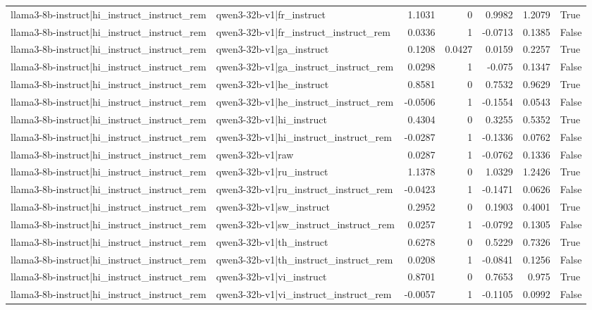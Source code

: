 \begin{table}
\begin{tabular}{l l r r r r l}
llama3-8b-instruct|hi_instruct_instruct_rem & qwen3-32b-v1|fr_instruct & 1.1031 & 0 & 0.9982 & 1.2079 & True \\
llama3-8b-instruct|hi_instruct_instruct_rem & qwen3-32b-v1|fr_instruct_instruct_rem & 0.0336 & 1 & -0.0713 & 0.1385 & False \\
llama3-8b-instruct|hi_instruct_instruct_rem & qwen3-32b-v1|ga_instruct & 0.1208 & 0.0427 & 0.0159 & 0.2257 & True \\
llama3-8b-instruct|hi_instruct_instruct_rem & qwen3-32b-v1|ga_instruct_instruct_rem & 0.0298 & 1 & -0.075 & 0.1347 & False \\
llama3-8b-instruct|hi_instruct_instruct_rem & qwen3-32b-v1|he_instruct & 0.8581 & 0 & 0.7532 & 0.9629 & True \\
llama3-8b-instruct|hi_instruct_instruct_rem & qwen3-32b-v1|he_instruct_instruct_rem & -0.0506 & 1 & -0.1554 & 0.0543 & False \\
llama3-8b-instruct|hi_instruct_instruct_rem & qwen3-32b-v1|hi_instruct & 0.4304 & 0 & 0.3255 & 0.5352 & True \\
llama3-8b-instruct|hi_instruct_instruct_rem & qwen3-32b-v1|hi_instruct_instruct_rem & -0.0287 & 1 & -0.1336 & 0.0762 & False \\
llama3-8b-instruct|hi_instruct_instruct_rem & qwen3-32b-v1|raw & 0.0287 & 1 & -0.0762 & 0.1336 & False \\
llama3-8b-instruct|hi_instruct_instruct_rem & qwen3-32b-v1|ru_instruct & 1.1378 & 0 & 1.0329 & 1.2426 & True \\
llama3-8b-instruct|hi_instruct_instruct_rem & qwen3-32b-v1|ru_instruct_instruct_rem & -0.0423 & 1 & -0.1471 & 0.0626 & False \\
llama3-8b-instruct|hi_instruct_instruct_rem & qwen3-32b-v1|sw_instruct & 0.2952 & 0 & 0.1903 & 0.4001 & True \\
llama3-8b-instruct|hi_instruct_instruct_rem & qwen3-32b-v1|sw_instruct_instruct_rem & 0.0257 & 1 & -0.0792 & 0.1305 & False \\
llama3-8b-instruct|hi_instruct_instruct_rem & qwen3-32b-v1|th_instruct & 0.6278 & 0 & 0.5229 & 0.7326 & True \\
llama3-8b-instruct|hi_instruct_instruct_rem & qwen3-32b-v1|th_instruct_instruct_rem & 0.0208 & 1 & -0.0841 & 0.1256 & False \\
llama3-8b-instruct|hi_instruct_instruct_rem & qwen3-32b-v1|vi_instruct & 0.8701 & 0 & 0.7653 & 0.975 & True \\
llama3-8b-instruct|hi_instruct_instruct_rem & qwen3-32b-v1|vi_instruct_instruct_rem & -0.0057 & 1 & -0.1105 & 0.0992 & False \\

\end{tabular}
\end{table}
